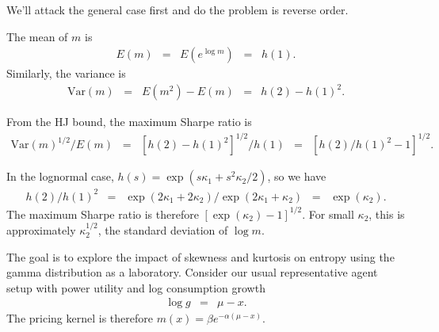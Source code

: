 \documentclass[11pt]{exam}
\begin{document}
\begin{questions}
\begin{solution}
We'll attack the general case first and
do the problem is reverse order.
\begin{parts}
\item The mean of $m$ is
\begin{eqnarray*}
    E(m) &=& E (e^{\log m}) \;\;=\;\; h(1) .
\end{eqnarray*}
Similarly, the variance is
\begin{eqnarray*}
    \mbox{Var}(m) \;\;=\;\; E(m^2) - E(m)  &=& h(2) - h(1)^2 .
\end{eqnarray*}
\item From the HJ bound, the maximum Sharpe ratio is
\begin{eqnarray*}
    \mbox{Var}(m)^{1/2}/E(m) \;\;=\;\; [h(2) - h(1)^2]^{1/2} / h(1)
        &=& [h(2)/h(1)^2 - 1]^{1/2}  .
\end{eqnarray*}

\item In the lognormal case,
$ h(s) = \exp(s \kappa_1 + s^2 \kappa_2 /2 )$,
so we have
\begin{eqnarray*}
    h(2)/h(1)^2 &=& \exp(2 \kappa_1 + 2 \kappa_2) / \exp(2 \kappa_1 + \kappa_2)
            \;\;=\;\; \exp(\kappa_2) .
\end{eqnarray*}
The maximum Sharpe ratio is therefore $ [\exp(\kappa_2) - 1]^{1/2} $.
For small $\kappa_2$, this is approximately $\kappa_2^{1/2} $,
the standard deviation of $\log m$.

\end{parts}
\end{solution}





The goal is to explore the impact of skewness and kurtosis
on entropy using the gamma distribution as a laboratory.
Consider our usual representative agent setup with power utility
and log consumption growth
\begin{eqnarray*}
    \log g &=& \mu - x .
\end{eqnarray*}
The pricing kernel is therefore $m(x) = \beta e^{-\alpha (\mu - x)} $.


\end{questions}
\end{document}
